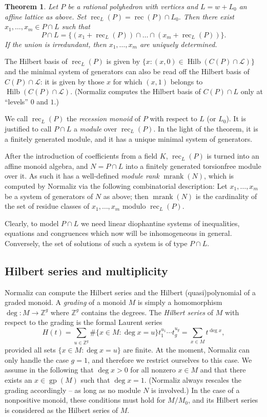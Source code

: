 \documentclass[12pt,a4paper]{scrartcl}
\newtheorem{theorem}{Theorem}
\theoremstyle{definition}
\def\ZZ{{\mathbb Z}}
\def\cL{{\mathcal L}}
\DeclareMathOperator{\gp}{gp}
\DeclareMathOperator{\rec}{rec}
\DeclareMathOperator{\mrank}{mrank}
\DeclareMathOperator{\Hilb}{Hilb}
\begin{document}
\begin{theorem}
	Let $P$ be a rational polyhedron with vertices and $L=w+L_0$ an affine lattice as above. Set $\rec_L(P)=\rec(P)\cap L_0$. Then there exist $x_1,\dots,x_m\in P\cap L$ such that
	$$
	P\cap L=\{(x_1+\rec_L(P))\cap\dots\cap(x_m+\rec_L(P))\}.
	$$
	If the union is irredundant, then $x_1,\dots,x_m$ are uniquely determined.
\end{theorem}

The Hilbert basis of $\rec_L(P)$ is given by $\{x: (x,0)\in \Hilb(C(P)\cap\cL)\}$ and the minimal system of generators can also be read off the Hilbert basis of $C(P)\cap \cL$: it is given by those $x$ for which $(x,1)$ belongs to $\Hilb(C(P)\cap\cL)$. (Normaliz computes the Hilbert basis of $C(P)\cap L$ only at ``levels'' $0$ and $1$.)

We call $\rec_L(P)$ the \emph{recession monoid} of $P$ with respect to $L$ (or $L_0$). It is justified to call $P\cap L$ a \emph{module} over $\rec_L(P)$. In the light of the theorem, it is a finitely generated module, and it has a unique minimal system of generators.

After the introduction of coefficients from a field $K$, $\rec_L(P)$ is turned into an affine monoid algebra, and $N=P\cap L$ into a finitely generated torsionfree module over it. As such it has a well-defined \emph{module rank} $\mrank(N)$, which is computed by Normaliz via the following combinatorial description: Let $x_1,\dots,x_m$ be a system of generators of $N$ as above; then $\mrank(N)$ is the cardinality of the set of residue classes of $x_1,\dots,x_m$ modulo $\rec_L(P)$.

Clearly, to model $P\cap L$ we need linear diophantine systems of inequalities, equations and congruences which now will be inhomogeneous in general. Conversely, the set of solutions of such a system is of type $P\cap L$.


\subsection{Hilbert series and multiplicity}\label{AppHilbertSeries}

Normaliz can compute the Hilbert series and the Hilbert
(quasi)polynomial of a graded monoid. A \emph{grading} of a
monoid $M$ is simply a homomorphism $\deg:M\to\ZZ^g$ where
$\ZZ^g$ contains the degrees. The \emph{Hilbert series} of $M$
with respect to the grading is the formal Laurent series
$$
H(t)=\sum_{u\in \ZZ^g} \#\{x\in M: \deg x=u\}t_1^{u_1}\cdots t_g^{u_g}=\sum_{x\in M}t^{\deg x},
$$
provided all sets $\{x\in M: \deg x=u\}$ are finite. At the moment, Normaliz can only handle the case $g=1$, and therefore we restrict ourselves to this case. We assume in the following that $\deg x >0$ for all nonzero $x\in M$ and that there exists an $x\in\gp(M)$ such that $\deg x=1$. (Normaliz always rescales the grading accordingly -- as long as no module $N$ is involved.) In the case of a nonpositive monoid, these conditions must hold for $M/M_0$, and its Hilbert series is considered as the Hilbert series of $M$.
\end{document}
